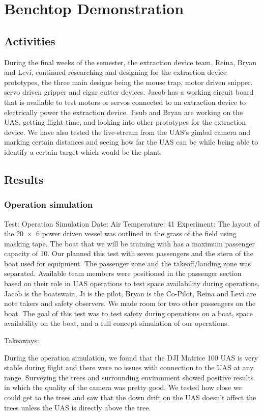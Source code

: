 \documentclass{wrcecapstone}
\begin{document}
\section{Benchtop Demonstration}
\subsection{Activities}
During the final weeks of the semester, the extraction device team, Reina, Bryan and Levi, continued researching and designing for the extraction device prototypes, the three main designs being the mouse trap, motor driven snipper, servo driven gripper and cigar cutter devices. Jacob has a working circuit board that is available to test motors or servos connected to an extraction device to electrically power the extraction device. Jisub and Bryan are working on the UAS, getting flight time, and looking into other prototypes for the extraction device. We have also tested the live-stream from the UAS’s gimbal camera and marking certain distances and seeing how far the UAS can be while being able to identify a certain target which would be the plant. 
        
\subsection{Results}
\subsubsection{Operation simulation}
Test: Operation Simulation
Date: 
Air Temperature: \SI{41}{\fahrenheit}
Experiment: The layout of the \SI{20x6}{\foot} power driven vessel was outlined in the grass of the field using masking tape. The boat that we will be training with has a maximum passenger capacity of 10. Our planned this test with seven passengers and the stern of the boat used for equipment. The passenger zone and the takeoff/landing zone was separated.  Available team members were positioned in the passenger section based on their role in UAS operations to test space availability during operations. Jacob is the boatswain, Ji is the pilot, Bryan is the Co-Pilot, Reina and Levi are note takers and safety observers. We made room for two other passengers on the boat. The goal of this test was to test safety during operations on a boat, space availability on the boat, and a full concept simulation of our operations.

Takeaways: 

During the operation simulation, we found that the DJI Matrice 100 UAS is very stable during flight and there were no issues with connection to the UAS at any range. Surveying the trees and surrounding environment showed positive results in which the quality of the camera was pretty good. We tested how close we could get to the trees and saw that the down drift on the UAS doesn’t affect the trees unless the UAS is directly above the tree. 
\end{document}
